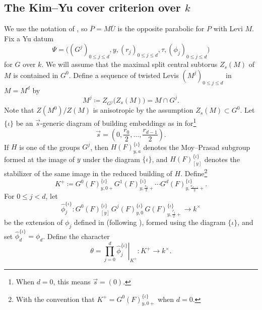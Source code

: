 \documentclass[reqno]{amsart}
\numberwithin{equation}{subsection}
\newcommand{\ol}[1]{\overline{#1}}
\newcommand{\co}{\colon}
\newcommand{\io}{\iota}
\theoremstyle{remark}
\numberwithin{equation}{subsection}
\numberwithin{figure}{subsection}
\begin{document}
\subsection{The Kim--Yu cover criterion over \texorpdfstring{\(k\)}{k}}

We use the notation of \cite[\S 6]{KY17}, so $\ol P=M\ol U$ is the opposite parabolic for $P$ with Levi $M$. Fix a Yu datum
\[
\Psi=\bigl((G^j)_{0\leq j\leq d},y,(r_j)_{0\leq j\leq d},
\tau,(\phi_j)_{0\leq j\leq d}\bigr)
\]
for $G$ over $k$. We will assume that the maximal split central subtorus $Z_s(M)$ of $M$ is contained in $G^0$. Define a sequence of twisted Levis $(M^j)_{0 \leq j \leq d}$ in $M = M^d$ by 
\[
M^j\coloneqq Z_{G^j}\bigl(Z_s(M)\bigr) = M\cap G^j.
\]
Note that $Z(M^0)/Z(M)$ is anisotropic by the assumption $Z_s(M) \subset G^0$. Let $\{\io\}$ be an $\vec s$-generic diagram of building embeddings as in \cite[\S 3.5]{KY17} for\footnote{When $d=0$, this means $\vec s=(0)$.}
\[
\vec s=\left(0,\frac{r_0}{2},\ldots,\frac{r_{d-1}}{2}\right).
\]
If $H$ is one of the groups $G^j$, then $H(F)^{\{\io\}}_{y,a}$ denotes the Moy--Prasad subgroup formed at the image of $y$ under the diagram $\{\io\}$, and $H(F)^{\{\io\}}_{[y]}$ denotes the stabilizer of the same image in the reduced building of $H$. Define\footnote{With the convention that $K^+=G^0(F)^{\{\io\}}_{y,0+}$ when $d=0$.}
\begin{equation}\label{eq:KY-plus-explicit}
K^+
\coloneqq
G^0(F)^{\{\io\}}_{y,0+}
G^1(F)^{\{\io\}}_{y,\frac{r_0}{2}+}\cdots
G^d(F)^{\{\io\}}_{y,\frac{r_{d-1}}{2}+}.
\end{equation}
For $0\leq j<d$, let
\[
\widehat\phi_j^{\{\io\}}\co
G^0(F)^{\{\io\}}_{[y]}\,G^j(F)^{\{\io\}}_{y,0}\,
G(F)^{\{\io\}}_{y,\frac{r_j}{2}+}\longrightarrow k^\times
\]
be the extension of $\phi_j$ defined in \cite[\S 6.2]{CF26a} (following \cite[\S 4]{Yu01}), formed using the diagram $\{\io\}$, and set $\widehat\phi_d^{\{\io\}}=\phi_d$. Define the character
\begin{equation}\label{eq:KY-theta-explicit}
\theta = \prod_{j=0}^{d}
\left.\widehat\phi_j^{\{\io\}}\right|_{K^+} \co K^+\longrightarrow k^\times.
\end{equation}
\end{document}
